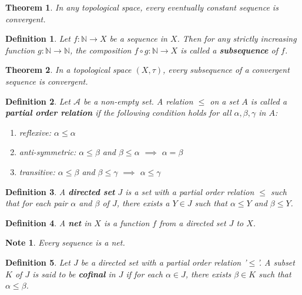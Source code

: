 \documentclass[14pt,twoside]{extreport}
\newtheorem*{defn}{Definition}
\newtheorem*{thm}{Theorem}
\newtheorem*{note}{Note}
\begin{document}
\begin{thm}
    In any topological space, every eventually constant sequence is convergent.
\end{thm}

\begin{defn}
    Let $f \colon \mathbb{N} \to X$ be a sequence in $X$. Then for any strictly increasing function $g \colon \mathbb{N} \to \mathbb{N}$, the composition $f \circ g \colon \mathbb{N} \to X$ is called a \textbf{subsequence} of $f$.
\end{defn}

\begin{thm}
    In a topological space $\left (X, \tau\right )$, every subsequence of a convergent sequence is convergent.
\end{thm}

\begin{defn}
    Let $\mathcal{A}$ be a non-empty set. A relation $\leq$ on a set $A$ is called a \textbf{partial order relation} if the following condition holds for all $\alpha, \beta, \gamma$ in $A$:
    \begin{enumerate}
        \item reflexive: $\alpha \leq \alpha$
        \item anti-symmetric: $\alpha \leq \beta$ and $\beta \leq \alpha$ $\implies$ $\alpha = \beta$
        \item transitive: $\alpha \leq \beta$ and $\beta \leq \gamma$ $\implies$ $\alpha \leq \gamma$
    \end{enumerate}
\end{defn}

\begin{defn}
    A \textbf{directed set} $J$ is a set with a partial order relation $\leq$ such that for each pair $\alpha$ and $\beta$ of $J$, there exists a $Y \in J$ such that $\alpha \leq Y$ and $\beta \leq Y$.
\end{defn}

\begin{defn}
    A \textbf{net} in $X$ is a function $f$ from a directed set $J$ to $X$.
\end{defn}

\begin{note}
Every sequence is a net.
\end{note}

\begin{defn}
    Let $J$ be a directed set with a partial order relation '$\leq$'. A subset $K$ of $J$ is said to be \textbf{cofinal} in $J$ if for each $\alpha \in J$, there exists $\beta \in K$ such that $\alpha \leq \beta$.
\end{defn}
\end{document}
